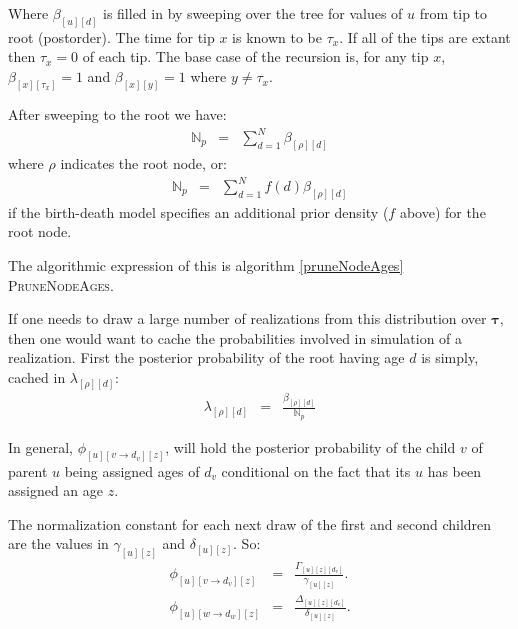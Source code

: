 \documentclass{llncs}
\newcommand{\timeBinRealizationVec}[0]{\ensuremath{\bm{\tau}}\xspace}
\newcommand{\timeBinRealization}[1]{\ensuremath{\tau_{#1}}\xspace}
\newcommand{\subtreeAgeSum}[2]{\ensuremath{\beta_{[{#1}][{#2}]}}\xspace}
\newcommand{\leftThreeDTable}[3]{\ensuremath{\Gamma_{[{#1}][{#2}][{#3}]}}\xspace}
\newcommand{\rightThreeDTable}[3]{\ensuremath{\Delta_{[{#1}][{#2}][{#3}]}}\xspace}
\newcommand{\leftSubtreeAgeSum}[2]{\ensuremath{\gamma_{[{#1}][{#2}]}}\xspace}
\newcommand{\rightSubtreeAgeSum}[2]{\ensuremath{\delta_{[{#1}][{#2}]}}\xspace}
\newcommand{\norm}[0]{\ensuremath{\mathbb{N}}\xspace}
\newcommand{\rootNode}[0]{\rho}
\newcommand{\rootPostProbCache}[2]{\ensuremath{\lambda_{[{#1}][{#2}]}}\xspace}
\newcommand{\postProbCache}[3]{\ensuremath{\phi_{[{#1}][{#2}][{#3}]}}\xspace}
\begin{document}
Where $\subtreeAgeSum{u}{d}$ is filled in by sweeping over the tree for values of $u$ from tip to root (postorder).
The time for tip $x$ is known to be $\timeBinRealization{x}$. 
If all of the tips are extant then $\timeBinRealization{x}=0$ of each tip.
The base case of the recursion is, for any tip $x$, $\subtreeAgeSum{x}{\timeBinRealization{x}} = 1$ and $\subtreeAgeSum{x}{y} = 1$
where $y\neq\timeBinRealization{x}$.

After sweeping to the root we have:
\begin{eqnarray}
    \norm_p & = & \sum_{d = 1}^{N} \subtreeAgeSum{\rootNode}{d}
\end{eqnarray}
where $\rootNode$ indicates the root node, or:
\begin{eqnarray}
    \norm_p & = & \sum_{d = 1}^{N} f(d)\subtreeAgeSum{\rootNode}{d}
\end{eqnarray}
if the birth-death model specifies an additional prior density ($f$ above) for the root node.


The algorithmic expression of this is algorithm \ref{pruneNodeAges} \textsc{PruneNodeAges}.

If one needs to draw a large number of realizations from this distribution over $\timeBinRealizationVec$,
    then one would want to cache the probabilities involved in simulation of 
    a realization.
First the posterior probability of the root having age $d$ is simply, cached in $\rootPostProbCache{\rootNode}{d}$:
\begin{eqnarray}
    \rootPostProbCache{\rootNode}{d} & = & \frac{\subtreeAgeSum{\rootNode}{d}}{\norm_p} \label{rootProb}
\end{eqnarray}

In general,  $\postProbCache{u}{v \rightarrow d_v}{z}$, will hold the posterior probability of
    the child $v$ of parent $u$ being assigned ages of $d_v$
    conditional on the fact that its $u$ has been assigned an age $z$.

The normalization constant for each next draw of the first and second children are
the values in $\leftSubtreeAgeSum{u}{z}$ and  $\rightSubtreeAgeSum{u}{z}$.
So:
\begin{eqnarray}
    \postProbCache{u}{v\rightarrow d_v}{z} & = & \frac{
    \leftThreeDTable{u}{z}{d_v}}{\leftSubtreeAgeSum{u}{z}}.\label{lcherryProb}\\
    \postProbCache{u}{w\rightarrow d_w}{z} & = & \frac{
    \rightThreeDTable{u}{z}{d_v}}{\rightSubtreeAgeSum{u}{z}}.\label{rcherryProb}
\end{eqnarray}
\end{document}
